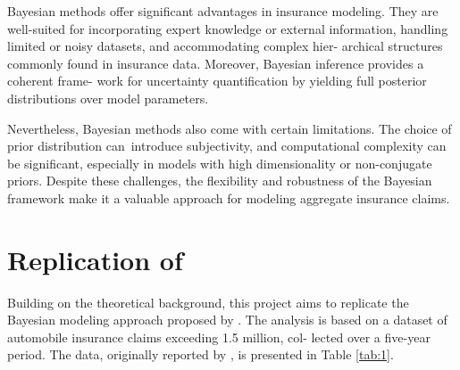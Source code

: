 \documentclass{Class/julia}
\begin{document}
Bayesian methods offer significant advantages in insurance modeling. They are well-suited for incorporating expert knowledge or external information, handling limited or noisy datasets, and accommodating complex hier- archical structures commonly found in insurance data. Moreover, Bayesian inference provides a coherent frame- work for uncertainty quantification by yielding full posterior distributions over model parameters.

Nevertheless, Bayesian methods also come with certain limitations. The choice of prior distribution can~introduce subjectivity, and computational complexity can be significant, especially in models with high dimensionality or non-conjugate priors. Despite these challenges, the flexibility and robustness of the Bayesian framework make it a valuable approach for modeling aggregate insurance claims.

\section{Replication of \citet{dudley2006bayesian}}

Building on the theoretical background, this project aims to replicate the Bayesian modeling approach proposed by \citet{dudley2006bayesian}. The analysis is based on a dataset of automobile insurance claims exceeding 1.5 million, col- lected over a five-year period. The data, originally reported by \citet{rytgaard1990pareto}, is presented in Table \ref{tab:1}.
\end{document}
